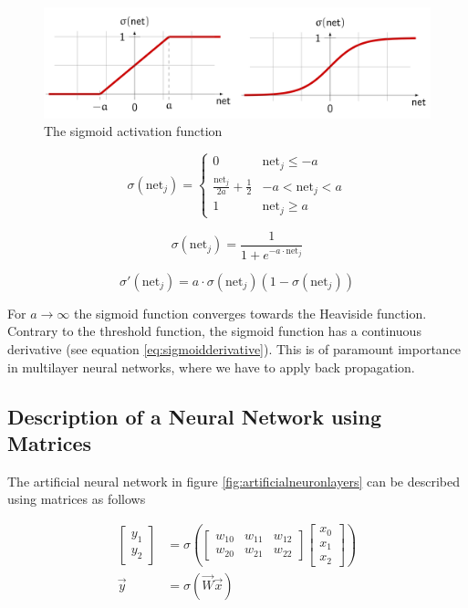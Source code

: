 \documentclass[11pt]{article}
\begin{document}
\begin{figure}[tbh!]
    \centering
    \includegraphics[keepaspectratio, width=0.7\linewidth]{Pictures/sigmoid_function}
    \caption{The sigmoid activation function}
    \label{fig:sigmoidfunction}
\end{figure}

\begin{equation}
    \sigma(\text{net}_j) = \left\{ \begin{matrix}0 & \text{net}_j \leq -a\\ \frac{\text{net}_j}{2a} +\frac{1}{2} & -a<\text{net}_j<a \\ 1 & \text{net}_j \geq a \end{matrix} \right.
\end{equation}

\begin{equation}
    \sigma(\text{net}_j) = \frac{1}{1+e^{-a\cdot\text{net}_j}}
\end{equation}

\begin{equation}\label{eq:sigmoidderivative}
    \sigma'(\text{net}_j) = a\cdot\sigma(\text{net}_j)(1-\sigma(\text{net}_j))
\end{equation}


For $a\rightarrow\infty$ the sigmoid function converges towards the Heaviside function. Contrary to the threshold function, the sigmoid function has a continuous derivative (see equation \ref{eq:sigmoidderivative}). This is of paramount importance in multilayer neural networks, where we have to apply back propagation.

\subsection{Description of a Neural Network using Matrices}

The artificial neural network in figure \ref{fig:artificialneuronlayers} can be described using matrices as follows

\begin{align}
    \begin{bmatrix}y_1\\y_2\end{bmatrix} &= \sigma\left( \begin{bmatrix}w_{10}&w_{11}&w_{12}\\w_{20}&w_{21}&w_{22}\end{bmatrix}\begin{bmatrix}x_0\\x_1\\x_2\end{bmatrix} \right)\\
    \vec{y} &= \sigma(\vec{W}\vec{x})
\end{align}
\end{document}

